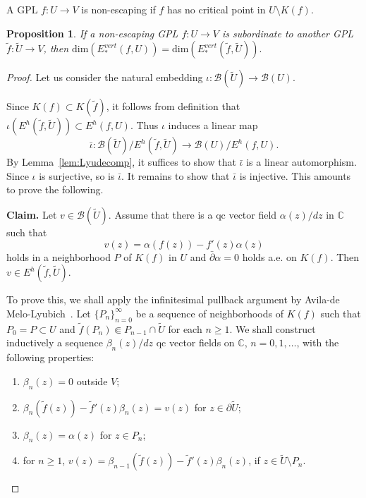 \documentclass{amsart}
\numberwithin{equation}{section}
\newtheorem{proposition}[theorem]{Proposition}%
\theoremstyle{definition}
\theoremstyle{remark}
\begin{document}
A GPL $f:U\to V$ is non-escaping if $f$ has no critical point in $U\setminus K(f)$.
\begin{proposition}\label{prop:subord} If a non-escaping GPL $f:U\to V$ is subordinate to another GPL $\widetilde{f}:\widetilde{U}\to V$, then 
$\text{dim}(E^{vert}_*(f, U))=\text{dim}(E^{vert}_*(\widetilde{f},\widetilde{U})).$
\end{proposition}
\begin{proof} Let us consider the natural embedding $\iota: \mathcal{B}(\widetilde{U})\to \mathcal{B}(U)$. 

Since $K(f)\subset K(\widetilde{f})$, it follows from definition that $\iota(E^h(\widetilde{f}, \widetilde{U}))\subset E^h(f, U)$. 
Thus $\iota$ induces a linear map $$\bar{\iota}:\mathcal{B}(\widetilde{U})/E^h(\widetilde{f}, \widetilde{U})\to \mathcal{B}(U)/E^h(f, U).$$
By Lemma~\ref{lem:Lyudecomp}, it suffices to show that $\bar{\iota}$ is a linear automorphism. Since $\iota$ is surjective, so is $\bar{\iota}$. It remains to show that $\bar{\iota}$ is injective. This amounts to prove the following.

{\bf Claim.} Let $v\in \mathcal{B}(\widetilde{U})$. Assume that there is a qc vector field $\alpha(z)/dz$ in $\mathbb{C}$ such that 
$$v(z)=\alpha(f(z))-f'(z) \alpha(z)$$
holds in a neighborhood $P$ of $K(f)$ in $U$ and $\bar{\partial} \alpha=0$ holds a.e. on $K(f)$. Then $v\in E^h(\widetilde{f}, \widetilde{U})$. 

To prove this, we shall apply the infinitesimal pullback argument by Avila-de Melo-Lyubich~\cite[Section 6.2]{ALM}. Let $\{P_n\}_{n=0}^\infty$ be a sequence of neighborhoods of $K(f)$ such that $P_0=P\subset U$ and $\widetilde{f}(P_{n})\Subset P_{n-1}\cap \widetilde{U}$ for each $n\ge 1$.
We shall construct inductively a sequence $\beta_n(z)/dz$ qc vector fields on $\mathbb{C}$, $n=0,1,\ldots$, with the following properties:
\begin{enumerate}
\item $\beta_n(z)=0$ outside $V$;
\item $\beta_n(\widetilde{f}(z))-\widetilde{f}'(z)\beta_n(z)=v(z)$ for $z\in \partial \widetilde{U}$;
\item $\beta_n(z)=\alpha(z)$ for $z\in P_n$; 
\item for $n\ge 1$,  $v(z)=\beta_{n-1}(\widetilde{f}(z))-\widetilde{f}'(z)\beta_n(z)$,  
if $z\in \widetilde{U}\setminus P_{n}$.
\end{enumerate}



\end{proof}
\end{document}
